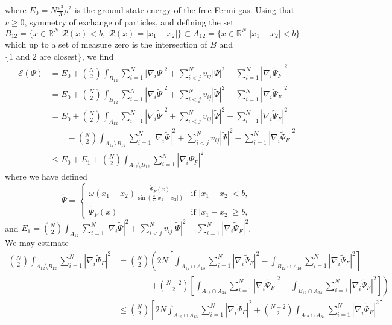 \documentclass[a4paper,11pt]{article}
\newcommand{\abs}[1]{\left\lvert #1 \right\rvert}
\newcommand{\R}{\mathbb{R}}
\newcommand{\rr}{\mathcal{R}}
\numberwithin{equation}{section}
\begin{document}
	where $ E_0=N\frac{\pi^2}{3}\rho^2 $ is the ground state energy of the free Fermi gas. Using that $ v\geq0 $, symmetry of exchange of particles, and defining the set $ B_{12}=\{x\in\R^N \vert \rr(x)<b,\ \rr(x)=\abs{x_1-x_2} \}\subset A_{12}=\{x\in\R^N\vert \abs{x_1-x_2}<b\} $ which up to a set of measure zero is the intersection of $ B $ and $ \{\text{1 and 2 are closest}\} $, we find \begin{equation}
	\begin{aligned}
	\mathcal{E}(\Psi)&=E_0+\binom{N}{2}\int_{B_{12}} \sum_{i=1}^{N}\abs{\nabla_i\Psi}^2+\sum_{i<j}^{N}v_{ij}\abs{\Psi}^2-\sum_{i=1}^{N}\abs{\nabla_i\tilde{\Psi}_F}^2\\&
	=E_0+\binom{N}{2}\int_{B_{12}} \sum_{i=1}^{N}\abs{\nabla_i\tilde{\Psi}}^2+\sum_{i<j}^{N}v_{ij}\abs{\tilde{\Psi}}^2-\sum_{i=1}^{N}\abs{\nabla_i\tilde{\Psi}_F}^2\\&
	=E_0+\binom{N}{2}\int_{A_{12}} \sum_{i=1}^{N}\abs{\nabla_i\tilde{\Psi}}^2+\sum_{i<j}^{N}v_{ij}\abs{\tilde{\Psi}}^2-\sum_{i=1}^{N}\abs{\nabla_i\tilde{\Psi}_F}^2\\&\qquad
	-\binom{N}{2}\int_{A_{12}\setminus B_{12}} \sum_{i=1}^{N}\abs{\nabla_i\tilde{\Psi}}^2+\sum_{i<j}^{N}v_{ij}\abs{\tilde{\Psi}}^2-\sum_{i=1}^{N}\abs{\nabla_i\tilde{\Psi}_F}^2\\&
	\leq E_0+E_1+\binom{N}{2}\int_{A_{12}\setminus B_{12}}\sum_{i=1}^{N}\abs{\nabla_i\tilde{\Psi}_F}^2
	\end{aligned}
	\end{equation}
	where we have defined \begin{equation*}
		\tilde{\Psi}=\begin{cases}
		\omega(x_1-x_2)\frac{\tilde{\Psi}_F(x)}{\sin\left(\frac{\pi}{L}\abs{x_1-x_2}\right)}& \text{if }\abs{x_1-x_2}<b,\\
		\tilde{\Psi}_F(x)&\text{if }\abs{x_1-x_2}\geq b,
		\end{cases}
	\end{equation*} and $ E_1=\binom{N}{2}\int_{A_{12}} \sum_{i=1}^{N}\abs{\nabla_i\tilde{\Psi}}^2+\sum_{i<j}^{N}v_{ij}\abs{\tilde{\Psi}}^2-\sum_{i=1}^{N}\abs{\nabla_i\tilde{\Psi}_F}^2 $.\\
	We may estimate \begin{equation}
	\begin{aligned}
	\binom{N}{2}\int_{A_{12}\setminus B_{12}}\sum_{i=1}^{N}\abs{\nabla_i\tilde{\Psi}_F}^2&=\binom{N}{2}\left(2N\left[\int_{A_{12}\cap A_{13}}\sum_{i=1}^{N}\abs{\nabla_i\tilde{\Psi}_F}^2-\int_{B_{12}\cap A_{13}}\sum_{i=1}^{N}\abs{\nabla_i\tilde{\Psi}_F}^2\right]\right.\\
	&\qquad\qquad\left.+\binom{N-2}{2}\left[\int_{A_{12}\cap A_{34}}\sum_{i=1}^{N}\abs{\nabla_i\tilde{\Psi}_F}^2-\int_{B_{12}\cap A_{34}}\sum_{i=1}^{N}\abs{\nabla_i\tilde{\Psi}_F}^2\right]\right)\\
	&\leq \binom{N}{2}\left[2N\int_{A_{12}\cap A_{13}}\sum_{i=1}^{N}\abs{\nabla_i\tilde{\Psi}_F}^2+\binom{N-2}{2}\int_{A_{12}\cap A_{34}}\sum_{i=1}^{N}\abs{\nabla_i\tilde{\Psi}_F}^2\right]
	\end{aligned}
	\end{equation}
\end{document}
